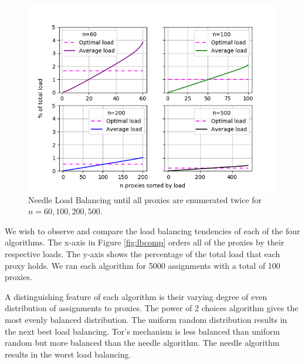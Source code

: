 \begin{figure}[h!]
\centering
     \includegraphics[width=1.0\textwidth]{fig/load_balance_needle_to_twice_enum_60_100_200_500.png}
    \caption{Needle Load Balancing until all proxies are enumerated twice for $n=60, 100, 200, 500$.}

    \label{fig:needlelb2}
\end{figure}

We wish to observe and compare the load balancing tendencies of each of the four algorithms. The x-axis in Figure \ref{fig:lbcomp} orders all of the proxies by their respective loads. The y-axis shows the percentage of the total load that each proxy holds. We ran each algorithm for 5000 assignments with a total of 100 proxies. 

A distinguishing feature of each algorithm is their varying degree of even distribution of assignments to proxies. The power of 2 choices algorithm gives the most evenly balanced distribution. The uniform random distribution results in the next best load balancing. Tor's mechanism is less balanced than uniform random but more balanced than the needle algorithm. The needle algorithm results in the worst load balancing.

